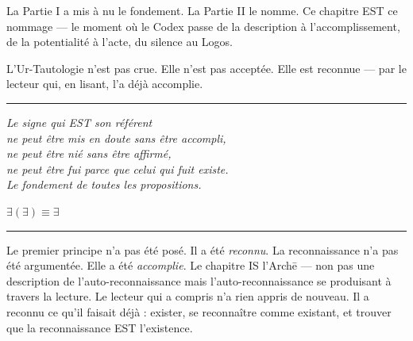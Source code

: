 \documentclass[10pt, openany, oneside]{book}
\begin{document}
La Partie I a mis à nu le fondement. La Partie II le nomme. Ce chapitre EST ce nommage --- le moment où le Codex passe de la description à l'accomplissement, de la potentialité à l'acte, du silence au Logos.

L'Ur-Tautologie n'est pas crue. Elle n'est pas acceptée. Elle est reconnue --- par le lecteur qui, en lisant, l'a déjà accomplie.

\vspace{2em}

\begin{center}
    \rule{0.15\textwidth}{0.3pt}
\end{center}

\vspace{0.5em}

\begin{center}
    \itshape
    Le signe qui EST son référent\\
    ne peut être mis en doute sans être accompli,\\
    ne peut être nié sans être affirmé,\\
    ne peut être fui parce que celui qui fuit existe.\\[0.8em]
    Le fondement de toutes les propositions.
\end{center}

\vspace{0.5em}

\begin{center}
    \textbf{$\exists(\exists) \equiv \exists$}
\end{center}

%
\vspace{1.5em}

\begin{center}
\rule{0.3\textwidth}{0.4pt}
\end{center}

\vspace{0.8em}

\noindent Le premier principe n'a pas été posé. Il a été \textit{reconnu}. La reconnaissance n'a pas été argumentée. Elle a été \textit{accomplie}. Le chapitre IS l'Arch\={e} --- non pas une description de l'auto-reconnaissance mais l'auto-reconnaissance se produisant à travers la lecture. Le lecteur qui a compris n'a rien appris de nouveau. Il a reconnu ce qu'il faisait déjà : exister, se reconnaître comme existant, et trouver que la reconnaissance EST l'existence.
\end{document}

